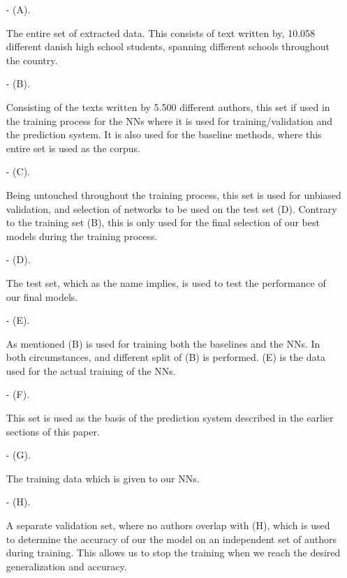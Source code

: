 \begin{itemize}

    \item[- (A).]

        The entire set of extracted data. This consists of text written by,
        10.058 different danish high school students, spanning different schools
        throughout the country.

    \item[- (B).]

        Consisting of the texts written by 5.500 different authors, this set
        if used in the training process for the \gls{NN}s where it is used for
        training/validation and the prediction system. It is also used for the
        baseline methods, where this entire set is used as the corpus.

    \item[- (C).]

        Being untouched throughout the training process, this set is used for
        unbiased validation, and selection of networks to be used on the test
        set (D). Contrary to the training set (B), this is only used for the
        final selection of our best models during the training process.

    \item[- (D).]

        The test set, which as the name implies, is used to test the performance
        of our final models.

    \item[- (E).]

        As mentioned (B) is used for training both the baselines and the
        \gls{NN}s. In both circumstances, and different split of (B) is
        performed. (E) is the data used for the actual training of the
        \gls{NN}s.

    \item[- (F).]

        This set is used as the basis of the prediction system described in the
        earlier sections of this paper.

    \item[- (G).]

        The training data which is given to our \gls{NN}s.

    \item[- (H).]

        A separate validation set, where no authors overlap with (H), which is
        used to determine the accuracy of our the model on an independent set
        of authors during training. This allows us to stop the training when we
        reach the desired generalization and accuracy.


\end{itemize}

